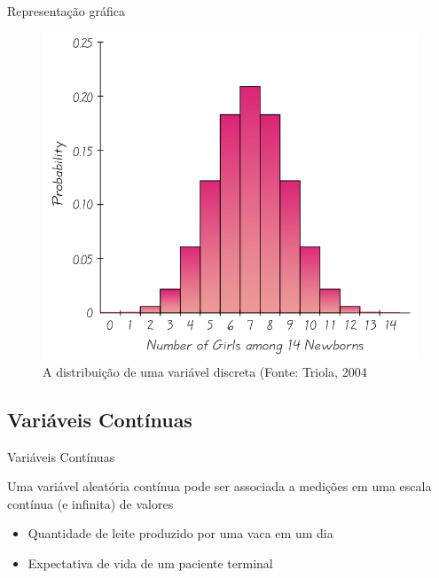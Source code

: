 \documentclass{beamer}
\begin{document}
\begin{frame}{Representação gráfica}
  \begin{figure}
    \centering
    \includegraphics[height=0.6\textheight]{Prob_II/discreta}
    \caption{A distribuição de uma variável discreta (Fonte: Triola,
      2004}
  \end{figure}
\end{frame}

\subsection{Variáveis Contínuas}
\begin{frame}{Variáveis Contínuas}
  \begin{definition}
    Uma variável aleatória \alert{contínua} pode ser associada a
    medições em uma escala contínua (e infinita) de valores
  \end{definition}
  \begin{example}
    \begin{itemize}
    \item Quantidade de leite produzido por uma vaca em um dia
    \item Expectativa de vida de um paciente terminal
    \end{itemize}    
  \end{example}
\end{frame}
\end{document}

